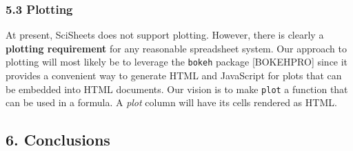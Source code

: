 \documentclass[letterpaper,compsoc,twoside]{IEEEtran}
\begin{document}
\subsubsection{5.3 Plotting%
  \label{plotting}%
}


At present, SciSheets does not support plotting.
However, there is clearly a \textbf{plotting requirement} for
any reasonable spreadsheet system.
Our approach to plotting will most likely be to leverage
the \texttt{bokeh} package {[}BOKEHPRO{]} since it provides a convenient way
to generate HTML and JavaScript for plots that can be embedded
into HTML documents.
Our vision is to make \texttt{plot} a function that can be used
in a formula.
A \emph{plot} column will have its cells rendered as HTML.

\subsection{6. Conclusions%
  \label{conclusions}%
}
\end{document}
